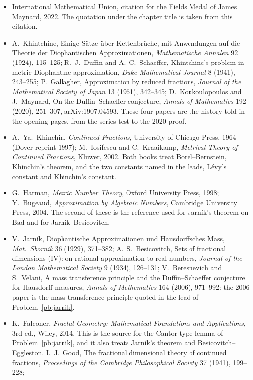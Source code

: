\begin{itemize}
\item International Mathematical Union, citation for the Fields Medal of James Maynard, 2022. The quotation under the chapter title is taken from this citation.
\item A.~Khintchine, Einige Sätze über Kettenbrüche, mit Anwendungen auf die Theorie der Diophantischen Approximationen, \emph{Mathematische Annalen} 92 (1924), 115--125;
R.~J.~Duffin and A.~C.~Schaeffer, Khintchine's problem in metric Diophantine approximation, \emph{Duke Mathematical Journal} 8 (1941), 243--255; P.~Gallagher,
Approximation by reduced fractions, \emph{Journal of the Mathematical Society of Japan} 13 (1961), 342--345; D.~Koukoulopoulos and J.~Maynard, On the Duffin--Schaeffer
conjecture, \emph{Annals of Mathematics} 192 (2020), 251--307, arXiv:1907.04593. These four papers are the history told in the opening pages, from the series test to the 2020 proof.
\item A.~Ya.~Khinchin, \emph{Continued Fractions}, University of Chicago Press, 1964 (Dover reprint 1997); M.~Iosifescu and C.~Kraaikamp, \emph{Metrical Theory of
Continued Fractions}, Kluwer, 2002. Both books treat Borel--Bernstein, Khinchin's theorem, and the two constants named in the leads, Lévy's constant and Khinchin's constant.
\item G.~Harman, \emph{Metric Number Theory}, Oxford University Press, 1998; Y.~Bugeaud, \emph{Approximation by Algebraic Numbers}, Cambridge University Press, 2004.
The second of these is the reference used for Jarník's theorem on $\mathrm{Bad}$ and for Jarník--Besicovitch.
\item V.~Jarník, Diophantische Approximationen und Hausdorffsches Mass, \emph{Mat.\ Sbornik} 36 (1929), 371--382; A.~S.~Besicovitch, Sets of fractional dimensions
(IV): on rational approximation to real numbers, \emph{Journal of the London Mathematical Society} 9 (1934), 126--131; V.~Beresnevich and S.~Velani, A mass transference
principle and the Duffin--Schaeffer conjecture for Hausdorff measures, \emph{Annals of Mathematics} 164 (2006), 971--992: the 2006 paper is the mass transference principle quoted in the lead of Problem~\ref{pb:jarnik}.
\item K.~Falconer, \emph{Fractal Geometry: Mathematical Foundations and Applications}, 3rd ed., Wiley, 2014. This is the source for the Cantor-type lemma of Problem~\ref{pb:jarnik}, and it also treats Jarník's theorem and Besicovitch--Eggleston.
I.~J.~Good, The fractional dimensional theory of continued fractions, \emph{Proceedings of the Cambridge Philosophical Society} 37 (1941), 199--228;

\end{itemize}
